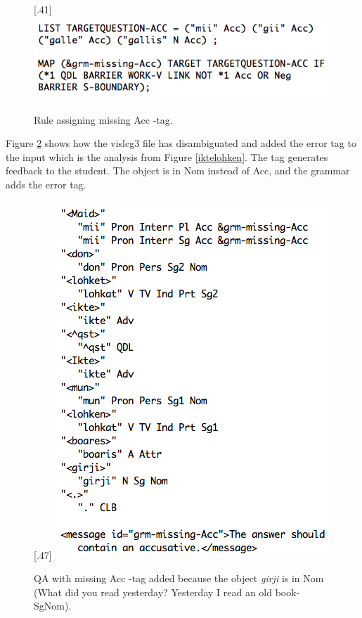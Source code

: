 \documentclass[11pt]{article}
\begin{document}
\begin{figure}[htbp]
\begin{center}
\scalebox{.41}[.41]{\includegraphics{presentation/img/pedcg3ny.png}}
\caption{Rule assigning missing Acc -tag.}
\label{cg3}
\end{center}
\end{figure}

Figure \ref{maidlohket} shows how the vislcg3 file has disambiguated and added the error tag to the input which is the analysis from Figure \ref{iktelohken}. The tag generates feedback to the student. The object is in Nom instead of Acc, and the grammar adds the error tag.

\begin{figure}[tbp]
\begin{center}
\scalebox{.47}[.47]{\includegraphics{presentation/img/vasta_feedback2.png}}
\caption{QA with missing Acc -tag added because the object \textit{girji} is in Nom (What did you read yesterday? Yesterday I read an old book-SgNom).}
\label{maidlohket}
\end{center}
\end{figure}
\end{document}
